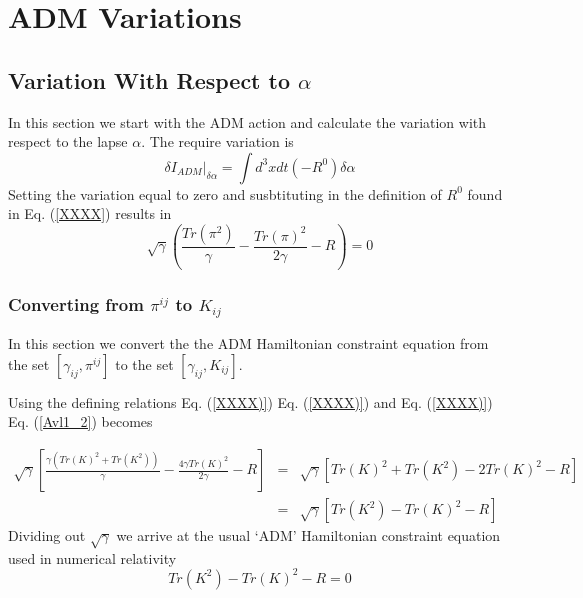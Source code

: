 \documentclass[12pt]{article}
\begin{document}
\section{ADM Variations}

\subsection{Variation With Respect to $ \alpha $}


In this section we start with the ADM action and calculate the variation
with respect to the lapse $ \alpha $.
The require variation is
\begin{equation}\label{Avl1_1}
{ \delta I_{ADM} } |_{\delta \alpha } = \int d^3x dt \left( - R^0 \right) \delta \alpha
\end{equation}
Setting the variation equal to zero and susbtituting in
the definition of $ R^0 $ found in Eq. (\ref{XXXX})
results in
\begin{equation}\label{Avl1_2}
\boxed{
\sqrt{\gamma} \left( \frac{ Tr( \pi ^2 ) }{ \gamma }
- \frac{ Tr( \pi ) ^2 }{ 2 \gamma } - R \right) = 0
}
\end{equation}
\subsubsection{Converting from $ \pi ^{ij} $ to $ K_{ij} $ }


In this section we convert the the ADM Hamiltonian constraint
equation from the set $ \left[ {\gamma}_{i j} , {\pi}^{i j} \right] $ to
the set $ \left[ {\gamma}_{i j} , {K}_{i j} \right] $.

Using the defining relations Eq. (\ref{XXXX)}) Eq. (\ref{XXXX)}) and Eq. (\ref{XXXX)})
Eq. (\ref{Avl1_2}) becomes

\begin{eqnarray}\label{AcK1_1}
\sqrt{\gamma} \left[ \frac{ \gamma \left( Tr( K ) ^2 + Tr( K ^2 ) \right) }{ \gamma }
- \frac{ 4 \gamma Tr( K ) ^ 2}{2 \gamma } - R \right]
& = & \sqrt{\gamma} \left[ Tr( K ) ^2 + Tr( K ^2 ) - 2 Tr( K ) ^2 - R \right] \nonumber \\
& = & \sqrt{\gamma} \left[ Tr( K ^2 ) - Tr( K ) ^2 - R \right]
\end{eqnarray}
Dividing out $ \sqrt{\gamma} $ we arrive at the usual `ADM' Hamiltonian
constraint equation used in numerical relativity \cite{YYYY}
\begin{equation}\label{AcK1_2}
\boxed{
Tr( K ^2 ) - Tr( K ) ^2 - R = 0
}
\end{equation}
\end{document}
